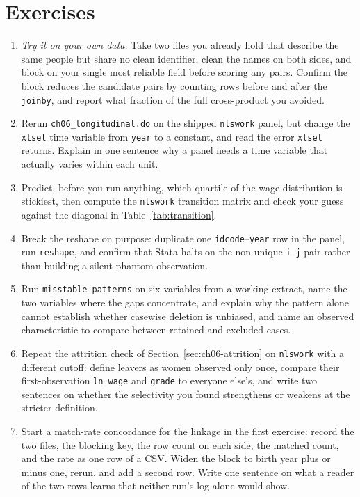 \documentclass[
    a4paper,
    fontsize=10pt,
    twoside=true,
    numbers=noenddot,
]{kaobook}
\begin{document}
\section*{Exercises}
\begin{enumerate}
\item \emph{Try it on your own data.} Take two files you already hold that describe the same people but share no clean identifier, clean the names on both sides, and block on your single most reliable field before scoring any pairs. Confirm the block reduces the candidate pairs by counting rows before and after the \texttt{joinby}, and report what fraction of the full cross-product you avoided.
\item Rerun \texttt{ch06\_longitudinal.do} on the shipped \texttt{nlswork} panel, but change the \texttt{xtset} time variable from \texttt{year} to a constant, and read the error \texttt{xtset} returns. Explain in one sentence why a panel needs a time variable that actually varies within each unit.
\item Predict, before you run anything, which quartile of the wage distribution is stickiest, then compute the \texttt{nlswork} transition matrix and check your guess against the diagonal in Table~\ref{tab:transition}.
\item Break the reshape on purpose: duplicate one \texttt{idcode}--\texttt{year} row in the panel, run \texttt{reshape}, and confirm that Stata halts on the non-unique \texttt{i}--\texttt{j} pair rather than building a silent phantom observation.
\item Run \texttt{misstable patterns} on six variables from a working extract, name the two variables where the gaps concentrate, and explain why the pattern alone cannot establish whether casewise deletion is unbiased, and name an observed characteristic to compare between retained and excluded cases.
\item Repeat the attrition check of Section~\ref{sec:ch06-attrition} on \texttt{nlswork} with a different cutoff: define leavers as women observed only once, compare their first-observation \texttt{ln\_wage} and \texttt{grade} to everyone else's, and write two sentences on whether the selectivity you found strengthens or weakens at the stricter definition.
\item Start a match-rate concordance for the linkage in the first exercise: record the two files, the blocking key, the row count on each side, the matched count, and the rate as one row of a CSV. Widen the block to birth year plus or minus one, rerun, and add a second row. Write one sentence on what a reader of the two rows learns that neither run's log alone would show.
\end{enumerate}
\end{document}
